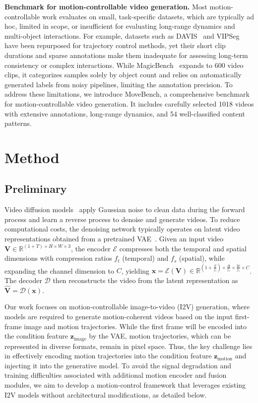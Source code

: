 \documentclass{article}
\begin{document}
\noindent \textbf{Benchmark for motion-controllable video generation.}
Most motion-controllable work evaluates on small, task-specific datasets, which are typically ad hoc, limited in scope, or insufficient for evaluating long-range dynamics and multi-object interactions. For example, datasets such as DAVIS~\cite{pont2017davis} and VIPSeg~\cite{miao2022vipseg} have been repurposed for trajectory control methods, yet their short clip durations and sparse annotations make them inadequate for assessing long-term consistency or complex interactions. While MagicBench~\cite{li2025magicmotion} expands to 600 video clips, it categorizes samples solely by object count and relies on automatically generated labels from noisy pipelines, limiting the annotation precision.
To address these limitations, we introduce MoveBench, a comprehensive benchmark for motion-controllable video generation.
It includes carefully selected 1018 videos with extensive annotations, long-range dynamics, and 54 well-classified content patterns.

\section{Method}
\label{sec:method}

\subsection{Preliminary}
Video diffusion models~\cite{ho2022video,wan,kong2024hunyuanvideo,blattmann2023svd} apply Gaussian noise to clean data during the forward process and learn a reverse process to denoise and generate videos. 
To reduce computational costs, the denoising network typically operates on latent video representations obtained from a pretrained VAE~\cite{kingma2013vae}. 
Given an input video  $\mathbf{V} \in \mathbb{R}^{(1+T)\times H \times W \times 3}$, the encoder $\mathcal{E}$ compresses both the temporal and spatial dimensions with compression ratios $f_t$ (temporal) and $f_s$ (spatial), while expanding the channel dimension to $C$, yielding $\mathbf{x} = \mathcal{E}(\mathbf{V}) \in \mathbb{R}^{(1+\frac{T}{f_t})\times \frac{H}{f_s} \times \frac{W}{f_s} \times C}$. 
The decoder $\mathcal{D}$ then reconstructs the video from the latent representation as $\hat{\mathbf{V}} = \mathcal{D}(\mathbf{x})$.

Our work focuses on motion-controllable image-to-video (I2V) generation, where models are required to generate motion-coherent videos based on the input first-frame image and motion trajectories. 
While the first frame will be encoded into the condition feature $\mathbf{z}_{\text{image}}$ by the VAE, motion trajectories, which can be represented in diverse formats, remain in pixel space.
Thus, the key challenge lies in effectively encoding motion trajectories into the condition feature $\mathbf{z}_{\text{motion}}$ and injecting it into the generative model. To avoid the signal degradation and training difficulties associated with additional motion encoder and fusion modules, we aim to develop a motion-control framework that leverages existing I2V models without architectural modifications, as detailed below.
\end{document}
